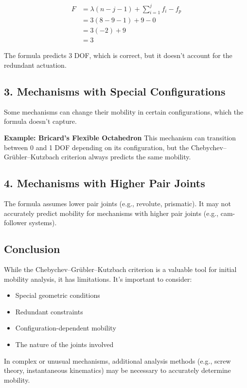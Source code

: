 \begin{solution}
    \begin{align*}
        F &= \lambda(n - j - 1) + \sum_{i=1}^j f_i - f_p \\
          &= 3(8 - 9 - 1) + 9 - 0 \\
          &= 3(-2) + 9 \\
          &= 3
    \end{align*}

    The formula predicts 3 DOF, which is correct, but it doesn't account for the redundant actuation.

    \subsection*{3. Mechanisms with Special Configurations}
    Some mechanisms can change their mobility in certain configurations, which the formula doesn't capture.

    \textbf{Example: Bricard's Flexible Octahedron}
    This mechanism can transition between 0 and 1 DOF depending on its configuration, but the Chebychev–Grübler–Kutzbach criterion always predicts the same mobility.

    \subsection*{4. Mechanisms with Higher Pair Joints}
    The formula assumes lower pair joints (e.g., revolute, prismatic). It may not accurately predict mobility for mechanisms with higher pair joints (e.g., cam-follower systems).

    \subsection*{Conclusion}
    While the Chebychev–Grübler–Kutzbach criterion is a valuable tool for initial mobility analysis, it has limitations. It's important to consider:

    \begin{itemize}
        \item Special geometric conditions
        \item Redundant constraints
        \item Configuration-dependent mobility
        \item The nature of the joints involved
    \end{itemize}

    In complex or unusual mechanisms, additional analysis methods (e.g., screw theory, instantaneous kinematics) may be necessary to accurately determine mobility.
\end{solution}

